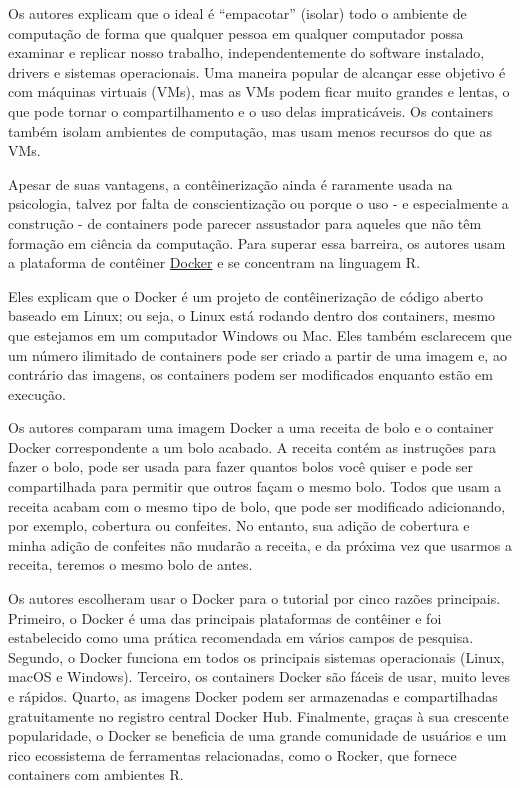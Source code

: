 \documentclass[
  a4paper,
]{book}
\begin{document}
\begin{tcolorbox}
Os autores explicam que o ideal é ``empacotar'' (isolar) todo o ambiente
de computação de forma que qualquer pessoa em qualquer computador possa
examinar e replicar nosso trabalho, independentemente do software
instalado, drivers e sistemas operacionais. Uma maneira popular de
alcançar esse objetivo é com máquinas virtuais (VMs), mas as VMs podem
ficar muito grandes e lentas, o que pode tornar o compartilhamento e o
uso delas impraticáveis. Os containers também isolam ambientes de
computação, mas usam menos recursos do que as VMs.\vspace{0.5em}

Apesar de suas vantagens, a contêinerização ainda é raramente usada na
psicologia, talvez por falta de conscientização ou porque o uso - e
especialmente a construção - de containers pode parecer assustador para
aqueles que não têm formação em ciência da computação. Para superar essa
barreira, os autores usam a plataforma de contêiner
\href{https://www.docker.com/}{Docker} e se concentram na linguagem
R.\vspace{0.5em}

Eles explicam que o Docker é um projeto de contêinerização de código
aberto baseado em Linux; ou seja, o Linux está rodando dentro dos
containers, mesmo que estejamos em um computador Windows ou Mac. Eles
também esclarecem que um número ilimitado de containers pode ser criado
a partir de uma imagem e, ao contrário das imagens, os containers podem
ser modificados enquanto estão em execução.\vspace{0.5em}

Os autores comparam uma imagem Docker a uma receita de bolo e o
container Docker correspondente a um bolo acabado. A receita contém as
instruções para fazer o bolo, pode ser usada para fazer quantos bolos
você quiser e pode ser compartilhada para permitir que outros façam o
mesmo bolo. Todos que usam a receita acabam com o mesmo tipo de bolo,
que pode ser modificado adicionando, por exemplo, cobertura ou
confeites. No entanto, sua adição de cobertura e minha adição de
confeites não mudarão a receita, e da próxima vez que usarmos a receita,
teremos o mesmo bolo de antes.\vspace{0.5em}

Os autores escolheram usar o Docker para o tutorial por cinco razões
principais. Primeiro, o Docker é uma das principais plataformas de
contêiner e foi estabelecido como uma prática recomendada em vários
campos de pesquisa. Segundo, o Docker funciona em todos os principais
sistemas operacionais (Linux, macOS e Windows). Terceiro, os containers
Docker são fáceis de usar, muito leves e rápidos. Quarto, as imagens
Docker podem ser armazenadas e compartilhadas gratuitamente no registro
central Docker Hub. Finalmente, graças à sua crescente popularidade, o
Docker se beneficia de uma grande comunidade de usuários e um rico
ecossistema de ferramentas relacionadas, como o Rocker, que fornece
containers com ambientes R.\vspace{0.5em}


\end{tcolorbox}
\end{document}
